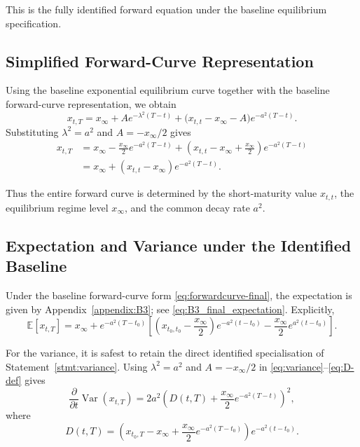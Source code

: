 \documentclass[12pt]{article}
\theoremstyle{statementstyle}
\begin{document}
This is the fully identified forward equation under the baseline
equilibrium specification.

\subsection{Simplified Forward-Curve Representation}
\label{subsec:revised-forwardcurve}

Using the baseline exponential equilibrium curve together with the baseline forward-curve representation, we obtain
\[
x_{t,T}
=
x_{\infty}
+
A e^{-\lambda^{2}(T-t)}
+
\bigl(x_{t,t}-x_{\infty}-A\bigr)e^{-a^{2}(T-t)}.
\]
Substituting \(\lambda^{2}=a^{2}\) and \(A=-x_{\infty}/2\) gives
\begin{align}
x_{t,T}
&=
x_{\infty}
-
\frac{x_{\infty}}{2}e^{-a^{2}(T-t)}
+
\left(x_{t,t}-x_{\infty}+\frac{x_{\infty}}{2}\right)e^{-a^{2}(T-t)}
\nonumber\\
&=
x_{\infty}
+
(x_{t,t}-x_{\infty})e^{-a^{2}(T-t)}.
\tag{5.5.1}\label{eq:forwardcurve-final}
\end{align}

Thus the entire forward curve is determined by the short-maturity value
\(x_{t,t}\), the equilibrium regime level \(x_{\infty}\), and the common decay rate
\(a^{2}\).

\subsection{Expectation and Variance under the Identified Baseline}
\label{subsec:instantaneous}

Under the baseline forward-curve form
\eqref{eq:forwardcurve-final}, the expectation is given by
Appendix~\ref{appendix:B3}; see \ref{eq:B3_final_expectation}. Explicitly,
\begin{equation}
\mathbb{E}[x_{t,T}]
=
x_\infty
+
e^{-a^2(T-t_0)}
\left[
\left(x_{t_0,t_0}-\frac{x_\infty}{2}\right)e^{-a^2(t-t_0)}
-
\frac{x_\infty}{2}e^{a^2(t-t_0)}
\right].
\tag{5.6.1}\label{eq:mean-final}
\end{equation}

For the variance, it is safest to retain the direct identified
specialisation of Statement~\ref{stmt:variance}. Using
\(\lambda^{2}=a^{2}\) and \(A=-x_{\infty}/2\) in
\eqref{eq:variance}--\eqref{eq:D-def} gives
\begin{equation}
\frac{\partial}{\partial t}\operatorname{Var}(x_{t,T})
=
2a^{2}
\left(
D(t,T)+\frac{x_{\infty}}{2}e^{-a^{2}(T-t)}
\right)^{2},
\tag{5.6.2}\label{eq:var-final}
\end{equation}
where
\begin{equation}
D(t,T)
=
\left(
x_{t_{0},T}
-
x_{\infty}
+
\frac{x_{\infty}}{2}e^{-a^{2}(T-t_{0})}
\right)e^{-a^{2}(t-t_{0})}.
\tag{5.6.3}\label{eq:D-final}
\end{equation}
\end{document}
